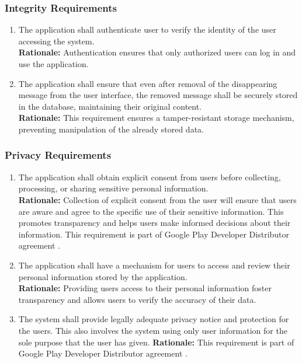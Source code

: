 \documentclass[]{article}
\begin{document}
\subsubsection{Integrity Requirements}
\label{ssub:integrity_requirements}
\begin{enumerate}[{SR-INT}1. ]
    \item The application shall authenticate user to verify the identity of the user accessing the system. \\
    {\bf Rationale:} Authentication ensures that only authorized users can log in and use the application.
    \item The application shall ensure that even after removal of the disappearing message from the user interface,
    the removed message shall be securely stored in the database, maintaining their original content. \\
    {\bf Rationale:} This requirement ensures a tamper-resistant storage mechanism, preventing manipulation 
    of the already stored data.
\end{enumerate}
\subsubsection{Privacy Requirements}
\label{ssub:privacy_requirements}
\begin{enumerate}[{SR-P}1. ]
    \item The application shall obtain explicit consent from users before collecting, processing, or sharing sensitive personal information. \\
    {\bf Rationale:} Collection of explicit consent from the user will ensure that users are aware and agree to the specific use of their sensitive information. 
    This promotes transparency and helps users make informed decisions about their information. This requirement is part of Google Play Developer
    Distributor agreement \cite{9c}.
    \item The application shall have a mechanism for users to access and review their personal information stored by the application. \\
    {\bf Rationale:} Providing users access to their personal information foster transparency and allows users to verify the accuracy of their data.
    \item The system shall provide legally adequate privacy notice and protection for the users. This also involves the system using only
    user information for the sole purpose that the user has given.
    {\bf Rationale:} This requirement is part of Google Play Developer Distributor agreement \cite{9c}.
\end{enumerate}
\end{document}
